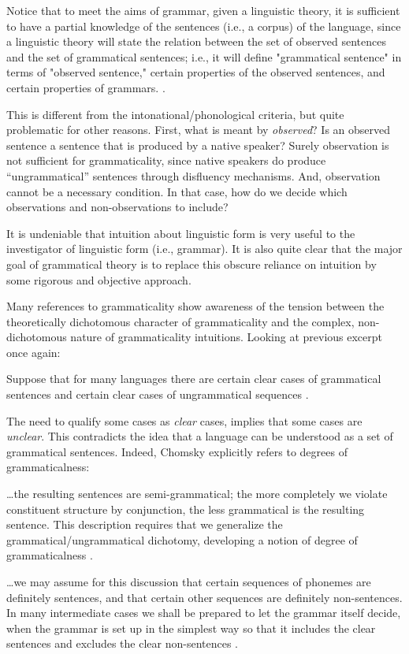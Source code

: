 Notice that to meet the aims of grammar, given a linguistic theory, it is sufficient to have a partial knowledge of the sentences (i.e., a corpus) of the language, since a linguistic theory will state the relation between the set of observed sentences and the set of grammatical sentences; i.e., it will define "grammatical sentence" in terms of "observed sentence," certain properties of the observed sentences, and certain properties of grammars. \citep[14]{Chomsky1957}.

  This is different from the intonational/phonological criteria, but quite problematic for other reasons. First, what is meant by \textit{observed}? Is an observed sentence a sentence that is produced by a native speaker? Surely observation is not sufficient for grammaticality, since native speakers do produce “ungrammatical” sentences through disfluency mechanisms. And, observation cannot be a necessary condition. In that case, how do we decide which observations and non-observations to include?

It is undeniable that intuition about linguistic form is very useful to the investigator of linguistic form (i.e., grammar). It is also quite clear that the major goal of grammatical theory is to replace this obscure reliance on intuition by some rigorous and objective approach. \citep[93-94]{Chomsky1957}

  Many references to grammaticality show awareness of the tension between the theoretically dichotomous character of grammaticality and the complex, non-dichotomous nature of grammaticality intuitions. Looking at previous excerpt once again:

Suppose that for many languages there are certain clear cases of grammatical sentences and certain clear cases of ungrammatical sequences \citep[113]{Chomsky1956}.

The need to qualify some cases as \textit{clear} cases, implies that some cases are \textit{unclear}. This contradicts the idea that a language can be understood as a set of grammatical sentences. Indeed, Chomsky explicitly refers to degrees of grammaticalness: 

…the resulting sentences are semi-grammatical; the more completely we violate constituent structure by conjunction, the less grammatical is the resulting sentence. This description requires that we generalize the grammatical/ungrammatical dichotomy, developing a notion of degree of grammaticalness \citep[36]{Chomsky1957}.

…we may assume for this discussion that certain sequences of phonemes are definitely sentences, and that certain other sequences are definitely non-sentences. In many intermediate cases we shall be prepared to let the grammar itself decide, when the grammar is set up in the simplest way so that it includes the clear sentences and excludes the clear non-sentences \citep[14]{Chomsky1957}.

